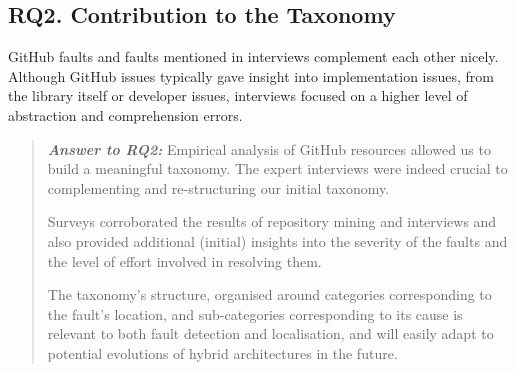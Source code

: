 \subsection{RQ2. Contribution to the Taxonomy}

GitHub faults and faults mentioned in interviews complement each other nicely. Although GitHub issues typically gave insight into implementation issues, from the library itself or developer issues, interviews focused on a higher level of abstraction and comprehension errors. 

\begin{quote}
\textbf{\emph{Answer to RQ2:}} 
Empirical analysis of GitHub resources allowed us to build a meaningful taxonomy. The expert interviews were indeed crucial to complementing and re-structuring our initial taxonomy. 

Surveys corroborated the results of repository mining and interviews and also provided additional (initial) insights into the severity of the faults and the level of effort involved in resolving them. 

The taxonomy's structure, organised around categories corresponding to the fault's location, and sub-categories corresponding to its cause is relevant to both fault detection and localisation, and will easily adapt to potential evolutions of hybrid architectures in the future.
\end{quote}